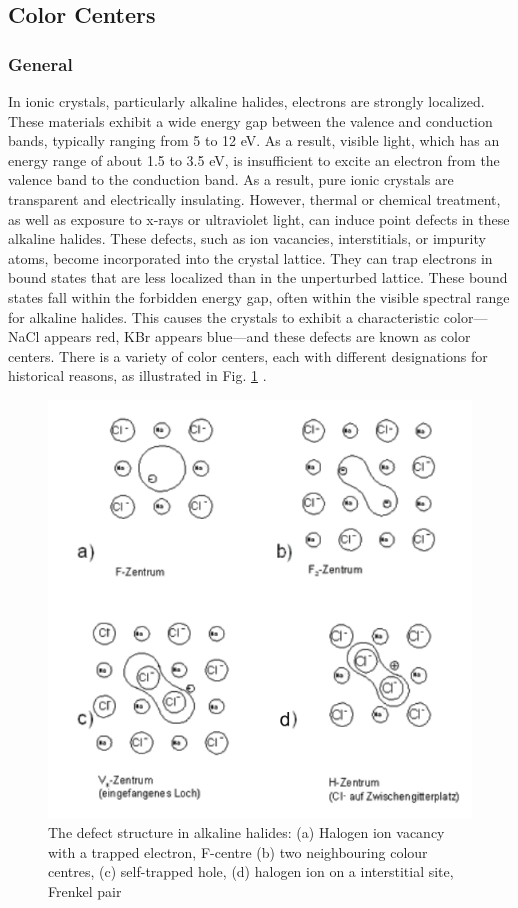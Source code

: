 \documentclass{article}
\begin{document}
\pagebreak{}

\subsection{Color Centers}

\subsubsection{General}

In ionic crystals, particularly alkaline halides, electrons are strongly localized. These materials exhibit a wide energy gap between the valence and conduction bands, typically ranging from 5 to 12 eV. As a result, visible light, which has an energy range of about 1.5 to 3.5 eV, is insufficient to excite an electron from the valence band to the conduction band. As a result, pure ionic crystals are transparent and electrically insulating. However, thermal or chemical treatment, as well as exposure to x-rays or ultraviolet light, can induce point defects in these alkaline halides. These defects, such as ion vacancies, interstitials, or impurity atoms, become incorporated into the crystal lattice. They can trap electrons in bound states that are less localized than in the unperturbed lattice. These bound states fall within the forbidden energy gap, often within the visible spectral range for alkaline halides. This causes the crystals to exhibit a characteristic color—NaCl appears red, KBr appears blue—and these defects are known as color centers. There is a variety of color centers, each with different designations for historical reasons, as illustrated in Fig. \ref{fig:colour centres} \cite{riede_optical}.

\begin{figure}[h!]
    \centering
    \includegraphics[width=0.4\linewidth]{Figures/Introduction/1.png}
    \caption{The defect structure in alkaline halides: (a) Halogen ion vacancy with a
trapped electron, F-centre (b) two neighbouring colour centres, (c) self-trapped hole, (d)
halogen ion on a interstitial site, Frenkel pair}
    \label{fig:colour centres}
\end{figure}
\end{document}
